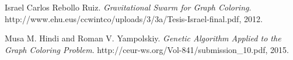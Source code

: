 \begin{thebibliography}{}

Israel Carlos Rebollo Ruiz. 
\textit{Gravitational Swarm for Graph Coloring}. 
http://www.ehu.eus/ccwintco/uploads/3/3a/Tesis-Israel-final.pdf, 2012.

Musa M. Hindi and Roman V. Yampolskiy. 
\textit{Genetic Algorithm Applied to the Graph Coloring Problem}. 
http://ceur-ws.org/Vol-841/submission\_10.pdf, 2015.

\end{thebibliography}


